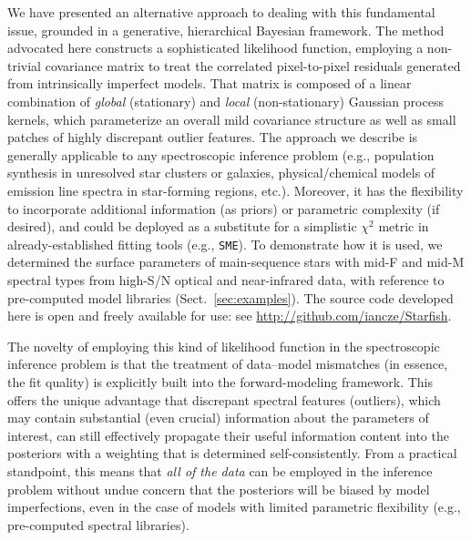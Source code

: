 \documentclass[iop,floatfix,numberedappendix,twocolappendix]{emulateapj}
\begin{document}
We have presented an alternative approach to dealing with this fundamental issue, grounded in a 
generative, hierarchical Bayesian framework.  The method advocated here constructs a sophisticated 
likelihood function, employing a non-trivial covariance matrix to treat the correlated 
pixel-to-pixel residuals generated from intrinsically imperfect models.  That matrix is composed of 
a linear combination of {\it global} (stationary) and {\it local} (non-stationary) Gaussian 
process kernels, which parameterize an overall mild covariance structure as well as small patches 
of highly discrepant outlier features.  The approach we describe is generally applicable to any 
spectroscopic inference problem (e.g., population synthesis in unresolved star clusters or 
galaxies, physical/chemical models of emission line spectra in star-forming regions, etc.).  
Moreover, it has the flexibility to incorporate additional information (as priors) or parametric 
complexity (if desired), and could be deployed as a substitute for a simplistic $\chi^2$ metric in 
already-established fitting tools (e.g., {\tt SME}).  To demonstrate how it is used, we determined 
the surface parameters of main-sequence stars with mid-F and mid-M spectral types from high-S/N 
optical and near-infrared data, with reference to pre-computed model libraries 
(Sect.~\ref{sec:examples}).  The source code developed here is open and freely available for use: 
see \url{http://github.com/iancze/Starfish}.

The novelty of employing this kind of likelihood function in the spectroscopic inference problem is 
that the treatment of data--model mismatches (in essence, the fit quality) is explicitly built into 
the forward-modeling framework.  This offers the unique advantage that discrepant spectral features 
(outliers), which may contain substantial (even crucial) information about the parameters of 
interest, can still effectively propagate their useful information content into the posteriors with 
a weighting that is determined self-consistently.  From a practical standpoint, this means that 
{\it all of the data} can be employed in the inference problem without undue concern that the 
posteriors will be biased by model imperfections, even in the case of models with limited 
parametric flexibility (e.g., pre-computed spectral libraries).
\end{document}
